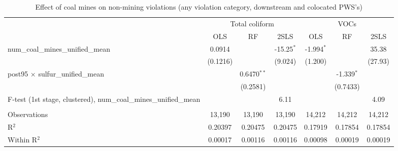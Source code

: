 
\begin{table}[htbp]
   
   \caption{\label{2sls_dwnstrmcolocate_nonminevio_allcat} Effect of coal mines on non-mining violations (any violation category, downstream and colocated PWS's)}
   \bigskip
   
   \centering
   
   \begin{adjustbox}{width = \textwidth, center}
      
      
      \begin{tabular}{lcccccc}
         \toprule
         
          & \multicolumn{3}{c}{Total coliform} & \multicolumn{3}{c}{VOCs}\\
         
                                                                            & OLS           & RF            & 2SLS          & OLS           & RF            & 2SLS\\  
         
         \midrule 
         num\_coal\_mines\_unified\_mean                                    & 0.0914        &               & -15.25$^{*}$  & -1.994$^{*}$  &               & 35.38\\   
                                                                            & (0.1216)      &               & (9.024)       & (1.200)       &               & (27.93)\\   
         post95 $\times$ sulfur\_unified\_mean                              &               & 0.6470$^{**}$ &               &               & -1.339$^{*}$  &   \\   
                                                                            &               & (0.2581)      &               &               & (0.7433)      &   \\   
         
         F-test (1st stage, clustered), num\_coal\_mines\_unified\_mean     &               &               & 6.11          &               &               & 4.09\\  
         
          \\
         
         Observations                                                       & 13,190        & 13,190        & 13,190        & 14,212        & 14,212        & 14,212\\  
         R$^2$                                                              & 0.20397       & 0.20475       & 0.20475       & 0.17919       & 0.17854       & 0.17854\\  
         Within R$^2$                                                       & 0.00017       & 0.00116       & 0.00116       & 0.00098       & 0.00019       & 0.00019\\  
         

\end{tabular}
\end{adjustbox}
\end{table}
